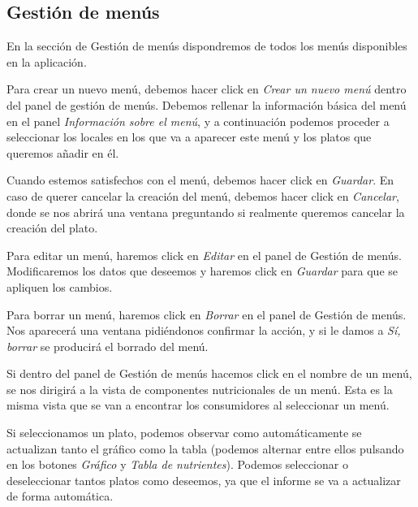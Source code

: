 
\subsection{Gestión de menús}

En la sección de Gestión de menús dispondremos de todos los menús disponibles en la aplicación.


Para crear un nuevo menú, debemos hacer click en \textit{Crear un nuevo menú} dentro del panel de gestión de menús. Debemos rellenar la información básica del menú en el panel \textit{Información sobre el menú}, y a continuación podemos proceder a seleccionar los locales en los que va a aparecer este menú y los platos que queremos añadir en él.

Cuando estemos satisfechos con el menú, debemos hacer click en \textit{Guardar}. En caso de querer cancelar la creación del menú, debemos hacer click en \textit{Cancelar}, donde se nos abrirá una ventana preguntando si realmente queremos cancelar la creación del plato.



Para editar un menú, haremos click en \textit{Editar} en el panel de Gestión de menús. Modificaremos los datos que deseemos y haremos click en \textit{Guardar} para que se apliquen los cambios.


Para borrar un menú, haremos click en \textit{Borrar} en el panel de Gestión de menús. Nos aparecerá una ventana pidiéndonos confirmar la acción, y si le damos a \textit{Sí, borrar} se producirá el borrado del menú.


Si dentro del panel de Gestión de menús hacemos click en el nombre de un menú, se nos dirigirá a la vista de componentes nutricionales de un menú. Esta es la misma vista que se van a encontrar los consumidores al seleccionar un menú.

Si seleccionamos un plato, podemos observar como automáticamente se actualizan tanto el gráfico como la tabla (podemos alternar entre ellos pulsando en los botones \textit{Gráfico} y \textit{Tabla de nutrientes}). Podemos seleccionar o deseleccionar tantos platos como deseemos, ya que el informe se va a actualizar de forma automática.

